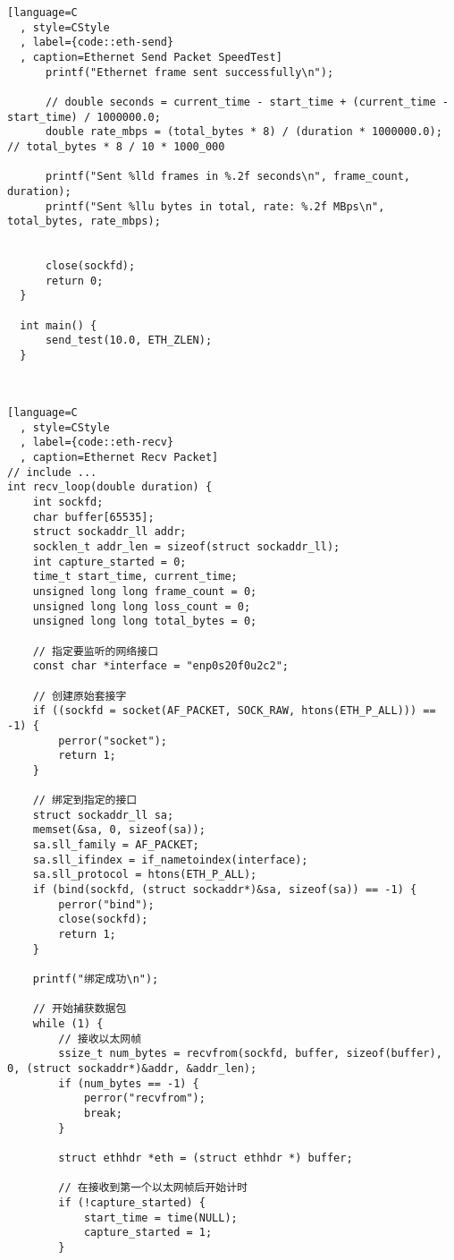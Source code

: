 \begin{lstlisting}[language=C
  , style=CStyle
  , label={code::eth-send}
  , caption=Ethernet Send Packet SpeedTest]
      printf("Ethernet frame sent successfully\n");
  
      // double seconds = current_time - start_time + (current_time - start_time) / 1000000.0;
      double rate_mbps = (total_bytes * 8) / (duration * 1000000.0); // total_bytes * 8 / 10 * 1000_000
  
      printf("Sent %lld frames in %.2f seconds\n", frame_count, duration);
      printf("Sent %llu bytes in total, rate: %.2f MBps\n", total_bytes, rate_mbps);
  
  
      close(sockfd);
      return 0;
  }
  
  int main() {
      send_test(10.0, ETH_ZLEN);
  }
  
  
\end{lstlisting}

\begin{lstlisting}[language=C
  , style=CStyle
  , label={code::eth-recv}
  , caption=Ethernet Recv Packet]
// include ...
int recv_loop(double duration) {
    int sockfd;
    char buffer[65535];
    struct sockaddr_ll addr;
    socklen_t addr_len = sizeof(struct sockaddr_ll);
    int capture_started = 0;
    time_t start_time, current_time;
    unsigned long long frame_count = 0;
    unsigned long long loss_count = 0;
    unsigned long long total_bytes = 0;

    // 指定要监听的网络接口
    const char *interface = "enp0s20f0u2c2";

    // 创建原始套接字
    if ((sockfd = socket(AF_PACKET, SOCK_RAW, htons(ETH_P_ALL))) == -1) {
        perror("socket");
        return 1;
    }

    // 绑定到指定的接口
    struct sockaddr_ll sa;
    memset(&sa, 0, sizeof(sa));
    sa.sll_family = AF_PACKET;
    sa.sll_ifindex = if_nametoindex(interface);
    sa.sll_protocol = htons(ETH_P_ALL);
    if (bind(sockfd, (struct sockaddr*)&sa, sizeof(sa)) == -1) {
        perror("bind");
        close(sockfd);
        return 1;
    }

    printf("绑定成功\n");

    // 开始捕获数据包
    while (1) {
        // 接收以太网帧
        ssize_t num_bytes = recvfrom(sockfd, buffer, sizeof(buffer), 0, (struct sockaddr*)&addr, &addr_len);
        if (num_bytes == -1) {
            perror("recvfrom");
            break;
        }

        struct ethhdr *eth = (struct ethhdr *) buffer;

        // 在接收到第一个以太网帧后开始计时
        if (!capture_started) {
            start_time = time(NULL);
            capture_started = 1;
        }


\end{lstlisting}

